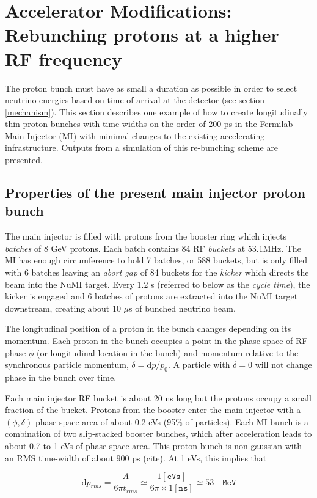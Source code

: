 
\section{Accelerator Modifications: Rebunching protons at a higher RF frequency}
\label{RF}

The proton bunch must have as small a duration as possible in order to
select neutrino energies based on time of arrival at the
detector (see section \ref{mechanism}). This section describes one example of how to
create longitudinally thin proton bunches with time-widths on the order of 200 ps in the Fermilab Main Injector (MI) with minimal changes to the existing accelerating infrastructure. Outputs from a simulation of
this re-bunching scheme are presented.


\subsection{Properties of the present main injector proton bunch}
The main injector is filled with protons from the booster ring which
injects \textit{batches} of 8 GeV protons. Each batch contains 84 RF
\textit{buckets} at 53.1MHz. The MI has enough circumference to hold 7 batches, or 588 buckets, but is only filled with 6 batches leaving an \textit{abort gap} of 84 buckets for the \textit{kicker} which directs the
 beam into the NuMI target. Every 1.2 s (referred to below as the \textit{cycle
  time}), the kicker is engaged and 6 batches of protons are extracted
into the NuMI target downstream, creating about 10 $\mu$s of bunched
neutrino beam.

The longitudinal position of a proton in the bunch changes depending
on its momentum. Each proton in the bunch occupies a point in the
phase space of RF phase $\phi$ (or longitudinal location in the bunch)
and momentum relative to the synchronous particle momentum, $\delta =
\mathrm{d}p/p_0$. A particle with $\delta = 0$ will not change phase in the bunch over time. 

Each main injector RF bucket is about 20 ns long but the protons occupy a small 
fraction of the bucket. Protons from the booster enter the main injector with a
$(\phi, \delta)$ phase-space area of about 0.2 eVs (95\% of particles). Each MI bunch
is a combination of two slip-stacked booster bunches, which after acceleration leads to
about 0.7 to 1 eVs of phase space area. This proton bunch is
non-gaussian with an RMS time-width of about 900 ps (cite). At 1 eVs, this implies that 

\begin{equation}
\mathrm{d}p_{rms} = \frac{A}{6\pi t_{rms}} \simeq \frac{1 [\texttt{eVs}]}{6\pi\times 1 [\texttt{ns}]}  \simeq 53 \quad \texttt{MeV}
\end{equation}

